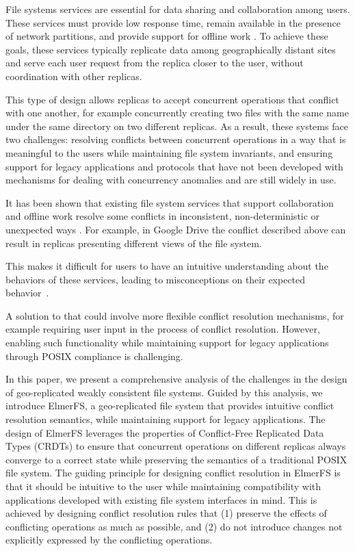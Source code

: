 \documentclass[sigconf, 10pt]{acmart}
\begin{document}
File systems services are essential for data sharing and collaboration among users.
These services must provide low response time, remain available in the presence
of network partitions, and provide support for offline work \cite{howard1988scale}.
To achieve these goals, these services typically replicate
data among geographically distant sites and serve each user request from the replica
closer to the user, without coordination with other replicas.

This type of design allows replicas to accept concurrent operations that conflict
with one another, for example concurrently creating two files with the same name
under the same directory on two different replicas.
As a result, these systems face two challenges:
resolving conflicts between concurrent operations in a way that is meaningful to the users while maintaining file system invariants,
and ensuring support for legacy applications and protocols that have not been developed with mechanisms for dealing with concurrency anomalies and are still widely in use.

It has been shown that existing file system services that support collaboration
and offline work resolve some conflicts in inconsistent, non-deterministic or unexpected ways \cite{cai2018some, taothanh:tel-01673030}.
For example, in Google Drive the conflict described above can result in replicas presenting different views of the file system.

This makes it difficult for users to have an intuitive understanding about
the behaviors of these services,
leading to misconceptions on their expected behavior~\cite{tang2013you}.

A solution to that could involve more flexible conflict resolution mechanisms,
for example requiring user input in the process of conflict resolution.
However, enabling such functionality while maintaining support for legacy applications
through POSIX compliance is challenging.

In this paper, we present a comprehensive analysis of the challenges in
the design of geo-replicated weakly consistent file systems.
Guided by this analysis, we introduce ElmerFS,
a geo-replicated file system that provides intuitive conflict resolution
semantics, while maintaining support for legacy applications.
The design of ElmerFS leverages the properties of Conflict-Free Replicated Data Types (CRDTs) to ensure that concurrent operations on different replicas always converge to a correct state while preserving the semantics of a traditional POSIX file system.
The guiding principle for designing conflict resolution in ElmerFS is that
it should be intuitive to the user while maintaining compatibility with applications developed with existing file system interfaces in mind.
This is achieved by designing conflict resolution rules that
(1) preserve the effects of conflicting operations as much as possible,
and (2) do not introduce changes not explicitly expressed by the conflicting operations.
\end{document}
